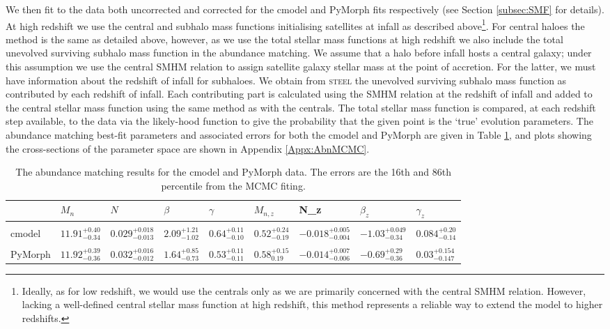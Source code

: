We then fit to the \cite{Davidzon2017TheSnapshots} data both uncorrected and corrected for the cmodel and PyMorph fits respectively (see Section \ref{subsec:SMF} for details). At high redshift we use the central and subhalo mass functions initialising satellites at infall as described above\footnote{Ideally, as for low redshift, we would use the centrals only as we are primarily concerned with the central SMHM relation. However, lacking a well-defined central stellar mass function at high redshift, this method represents a reliable way to extend the model to higher redshifts.}. For central haloes the method is the same as detailed above, however, as we use the total stellar mass functions at high redshift we also include the total unevolved surviving subhalo mass function in the abundance matching. 
We assume that a halo before infall hosts a central galaxy; under this assumption we use the central SMHM relation to assign satellite galaxy stellar mass at the point of accretion. For the latter, we must have information about the redshift of infall for subhaloes. We obtain from \textsc{steel} the unevolved surviving subhalo mass function as contributed by each redshift of infall. Each contributing part is calculated using the SMHM relation at the redshift of infall and added to the central stellar mass function using the same method as with the centrals. The total stellar mass function is compared, at each redshift step available, to the data via the likely-hood function to give the probability that the given point is the `true' evolution parameters. The abundance matching best-fit parameters and associated errors for both the cmodel and PyMorph are given in Table \ref{tab:AbnResult}, and plots showing the cross-sections of the parameter space are shown in Appendix \ref{Appx:AbnMCMC}.

\begin{table}
\centering
\begin{tabular}{l||llll|llll}
        & $M_n$ & $N$     & $\beta$ & $\gamma$ & $M_{n,z}$ & N\_z   & $\beta_z$ & $\gamma_z$ \\ \hline
\\
cmodel  & $11.91_{-0.34}^{+0.40}$ & $0.029_{-0.013}^{+0.018}$ & $2.09_{-1.02}^{+1.21}$    & $0.64_{-0.10}^{+0.11}$     & $0.52_{-0.19}^{+0.24}$       & $-0.018_{-0.004}^{+0.005}$ & $-1.03_{-0.34}^{+0.049}$     & $0.084_{-0.14}^{+0.20}$      \\
\\
PyMorph & $11.92_{-0.36}^{+0.39}$ & $0.032_{-0.012}^{+0.016}$ & $1.64_{-0.73}^{+0.85}$     & $0.53_{-0.11}^{+0.11}$     & $0.58_{0.19}^{+0.15}$        & $-0.014_{-0.006}^{+0.007}$ & $-0.69_{-0.36}^{+0.29}$      & $0.03_{-0.147}^{+0.154}$      
\end{tabular}
\caption{The abundance matching results for the cmodel and PyMorph data. The errors are the 16th and 86th percentile from the MCMC fiting.}
\label{tab:AbnResult}
\end{table}

